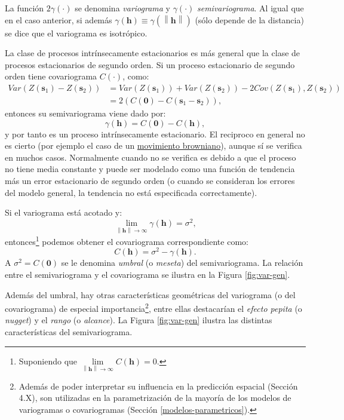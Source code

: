 \documentclass[
  spanish,
]{book}
\theoremstyle{break}
\begin{document}
La función \(2\gamma (\cdot)\) se denomina \emph{variograma} y \(\gamma (\cdot)\) \emph{semivariograma}.
Al igual que en el caso anterior, si además \(\gamma(\mathbf{h}) \equiv \gamma(\left\| \mathbf{h}\right\|)\) (sólo depende de la distancia) se dice que el variograma es isotrópico.

La clase de procesos intrínsecamente estacionarios es más general que la clase de procesos estacionarios de segundo orden.
Si un proceso estacionario de segundo orden tiene covariograma \(C(\cdot)\), como:
\[\begin{aligned}
Var(Z(\mathbf{s}_1)-Z(\mathbf{s}_2)) &= Var(Z(\mathbf{s}_1)) + Var(Z(\mathbf{s}_2))-2Cov(Z(\mathbf{s}_1),Z(\mathbf{s}_2)) \\
&=2\left(C(\mathbf{0})-C(\mathbf{s}_1 -\mathbf{s}_2)\right),
\end{aligned}\]
entonces su semivariograma viene dado por:
\[\gamma (\mathbf{h}) = C(\mathbf{0})-C(\mathbf{h}),\]
y por tanto es un proceso intrínsecamente estacionario.
El reciproco en general no es cierto (por ejemplo el caso de un \href{https://es.wikipedia.org/wiki/Movimiento_browniano\#Matem\%C3\%A1ticas}{movimiento browniano}), aunque sí se verifica en muchos casos.
Normalmente cuando no se verifica es debido a que el proceso no tiene media constante y puede ser modelado como una función de tendencia más un error estacionario de segundo orden (o cuando se consideran los errores del modelo general, la tendencia no está especificada correctamente).

Si el variograma está acotado y:
\[\lim \limits_{\left\| \mathbf{h}\right\| \rightarrow \infty }\gamma(\mathbf{h})=\sigma^2,\]
entonces\footnote{Suponiendo que \(\lim \limits_{\left\| \mathbf{h}\right\| \rightarrow \infty } C(\mathbf{h})=0\).} podemos obtener el covariograma correspondiente como:
\[C(\mathbf{h})=\sigma^2-\gamma (\mathbf{h}).\]
A \(\sigma^{2} = C(\mathbf{0})\) se le denomina \emph{umbral} (o \emph{meseta}) del semivariograma.
La relación entre el semivariograma y el covariograma se ilustra en la Figura \ref{fig:var-gen}.

Además del umbral, hay otras características geométricas del variograma (o del covariograma) de especial importancia\footnote{Además de poder interpretar su influencia en la predicción espacial (Sección 4.X), son utilizadas en la parametrización de la mayoría de los modelos de variogramas o covariogramas (Sección \ref{modelos-parametricos}).}, entre ellas destacarían el \emph{efecto pepita} (o \emph{nugget}) y el \emph{rango} (o \emph{alcance}).
La Figura \ref{fig:var-gen} ilustra las distintas características del semivariograma.
\end{document}
